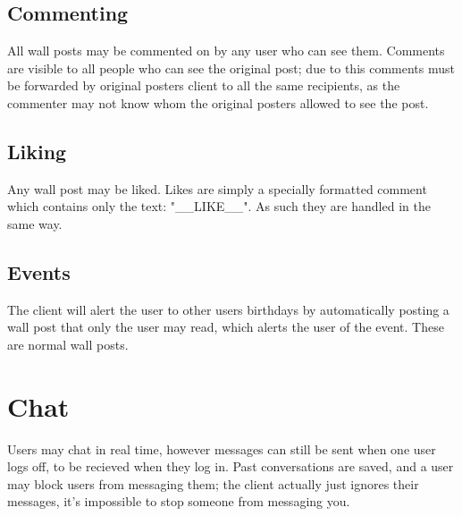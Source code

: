 \subsection{Commenting}
All wall posts may be commented on by any user who can see them. Comments are
visible to all people who can see the original post; due to this comments must
be forwarded by original posters client to all the same recipients, as the
commenter may not know whom the original posters allowed to see the post.
    
\subsection{Liking}
Any wall post may be liked. Likes are simply a specially formatted comment
which contains only the text: "\_\_LIKE\_\_". As such they are handled in the same
way.
    
\subsection{Events}
The client will alert the user to other users birthdays by automatically posting
a wall post that only the user may read, which alerts the user of the event.
These are normal wall posts.

\section{Chat}
Users may chat in real time, however messages can still be sent when one user
logs off, to be recieved when they log in. Past conversations are saved, and a
user may block users from messaging them; the client actually just ignores their
messages, it's impossible to stop someone from messaging you.
